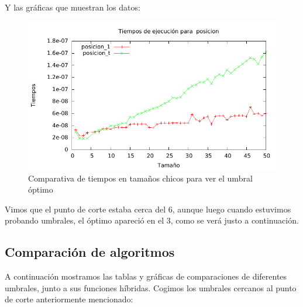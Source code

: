 Y las gráficas que muestran los datos:
\begin{figure}[H]\includegraphics[width=13cm]{img/posicion_todos1_g_50.pdf} \centering
	\caption{Comparativa de tiempos en tamaños chicos para ver el umbral óptimo}\end{figure}

Vimos que el punto de corte estaba cerca del 6, aunque luego cuando estuvimos probando umbrales, el óptimo apareció en el 3, como se verá justo a continuación.

\subsection{Comparación de algoritmos}

A continuación mostramos las tablas y gráficas de comparaciones de diferentes umbrales, junto a sus funciones híbridas. Cogimos los umbrales cercanos al punto de corte anteriormente mencionado:

\vspace*{1cm}

\posObvioCompUmbral
{}\posDyVUmbralOne
{}\posDyVUmbralTwo
{}\posDyVUmbralThree
{}\posDyVUmbralFour
{}\posDyVUmbralFive
{} {\posObvioCompUmbral}
 {\posObvioCompUmbral}
 {\posObvioCompUmbral}
 {\posObvioCompUmbral}
 {\posObvioCompUmbral}

